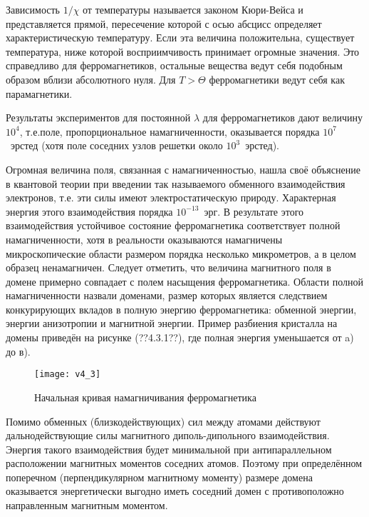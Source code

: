 Зависимость  $1/\chi$  от температуры называется законом Кюри-Вейса и представляется прямой, пересечение которой с осью абсцисс определяет характеристическую температуру. Если эта величина положительна, существует температура, ниже которой восприимчивость принимает огромные значения. Это справедливо для ферромагнетиков, остальные вещества ведут себя подобным образом  вблизи абсолютного нуля. Для $T>\Theta$ ферромагнетики ведут себя как парамагнетики.

Результаты экспериментов для постоянной $\lambda$ для ферромагнетиков дают величину $10^4$, т.е.поле, пропорциональное намагниченности, оказывается порядка $10^7$~эрстед (хотя поле соседних узлов решетки около $10^3$~эрстед).

Огромная величина поля, связанная с намагниченностью, нашла своё объяснение в квантовой теории при введении так называемого обменного взаимодействия электронов, т.е. эти силы имеют электростатическую природу. Характерная энергия этого взаимодействия порядка $10^{-13}$~эрг. В результате этого взаимодействия устойчивое состояние ферромагнетика соответствует полной намагниченности, хотя в реальности   оказываются намагничены микроскопические области размером порядка несколько микрометров, а в целом образец ненамагничен. Следует  отметить, что величина магнитного поля в домене примерно совпадает с полем насыщения ферромагнетика. Области полной намагниченности назвали доменами, размер которых является следствием конкурирующих вкладов в полную энергию ферромагнетика: обменной энергии, энергии анизотропии и магнитной энергии. Пример разбиения кристалла на домены приведён на рисунке (??4.3.1??), где полная энергия уменьшается от a) до в). 


\begin{wrapfigure}[]{r}{0.5\textwidth}
	\texttt{[image: v4\_3]}
	\caption{Начальная кривая намагничивания ферромагнетика}
\end{wrapfigure}

Помимо обменных (близкодействующих) сил между атомами действуют дальнодействующие силы магнитного диполь-дипольного взаимодействия. Энергия такого взаимодействия будет минимальной при антипараллельном расположении магнитных моментов соседних атомов. Поэтому при определённом поперечном (перпендикулярном магнитному моменту) размере домена оказывается энергетически выгодно иметь соседний домен с противоположно направленным магнитным моментом.

